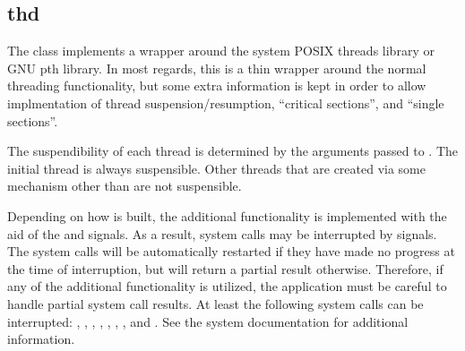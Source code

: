 %
%
%
%
%

\subsection{thd}
\label{thd}

The  class implements a wrapper around the system POSIX threads
library or GNU pth library.  In most regards, this is a thin wrapper around the
normal threading functionality, but some extra information is kept in order to
allow implmentation of thread suspension/resumption, ``critical sections'', and
``single sections''.

The suspendibility of each thread is determined by the arguments passed to
.  The initial thread is always suspensible.  Other threads
that are created via some mechanism other than  are not
suspensible.

Depending on how  is built, the additional functionality is
implemented with the aid of the  and  signals.  As a
result, system calls may be interrupted by signals.  The system calls will be
automatically restarted if they have made no progress at the time of
interruption, but will return a partial result otherwise.  Therefore, if any of
the additional functionality is utilized, the application must be careful to
handle partial system call results.  At least the following system calls can be
interrupted: , , ,
, , , , and
.  See the system documentation for additional information.


